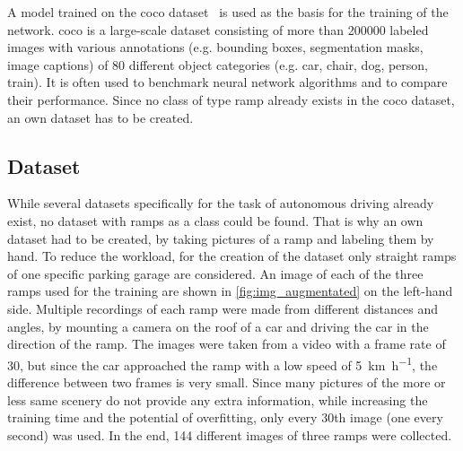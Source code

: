 A model trained on the \gls{coco} dataset~\cite{Lin2014} is used as the basis for the training of the network.
\gls{coco} is a large-scale dataset consisting of more than \num{200000} labeled images with various annotations (e.g. bounding boxes, segmentation masks, image captions) of 80 different object categories (e.g. car, chair, dog, person, train).
It is often used to benchmark neural network algorithms and to compare their performance.
Since no class of type ramp already exists in the \gls{coco} dataset, an own dataset has to be created.


\subsection{Dataset}
While several datasets specifically for the task of autonomous driving already exist, no dataset with ramps as a class could be found.
That is why an own dataset had to be created, by taking pictures of a ramp and labeling them by hand.
To reduce the workload, for the creation of the dataset only straight ramps of one specific parking garage are considered.
An image of each of the three ramps used for the training are shown in \cref{fig:img_augmentated} on the left-hand side.
Multiple recordings of each ramp were made from different distances and angles, by mounting a camera on the roof of a car and driving the car in the direction of the ramp.
The images were taken from a video with a frame rate of 30, but since the car approached the ramp with a low speed of \SI{5}{\kilo\metre\per\hour}, the difference between two frames is very small.
Since many pictures of the more or less same scenery do not provide any extra information, while increasing the training time and the potential of overfitting, only every 30th image (one every second) was used.
In the end, 144 different images of three ramps were collected.

